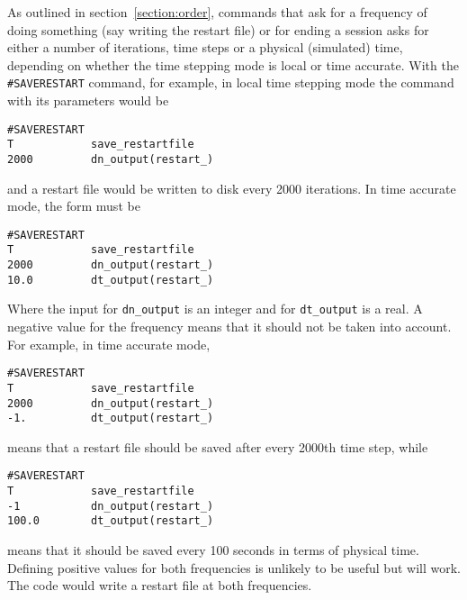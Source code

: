 As outlined in section~\ref{section:order}, commands that ask for a 
frequency of doing something (say 
writing the restart file) or for ending a session asks for either a number of
iterations, time steps or a physical (simulated) time, depending on whether the time
stepping mode is local or time accurate.
With the {\tt \#SAVERESTART} command, for example, in local time stepping mode
the command with its parameters would be
\begin{verbatim}
#SAVERESTART
T            save_restartfile
2000         dn_output(restart_)
\end{verbatim}
and a restart file would be written to disk every 2000 iterations. In
time accurate mode, the form must be 
\begin{verbatim}
#SAVERESTART
T            save_restartfile
2000         dn_output(restart_)
10.0         dt_output(restart_)
\end{verbatim}
Where the input for {\tt dn\_output} is an integer and for {\tt dt\_output}
is a real.
A negative value for the frequency means that it should not be taken 
into account. For example, in time accurate mode,
\begin{verbatim}
#SAVERESTART
T            save_restartfile
2000         dn_output(restart_)
-1.          dt_output(restart_)
\end{verbatim}
means that a restart file should be saved after every 2000th time step, while
\begin{verbatim}
#SAVERESTART
T            save_restartfile
-1           dn_output(restart_)
100.0        dt_output(restart_)
\end{verbatim}
means that it should be saved every 100 seconds in terms of physical time.
Defining positive values for both frequencies is unlikely to be useful but will
work.  The code would write a restart file at both frequencies.

